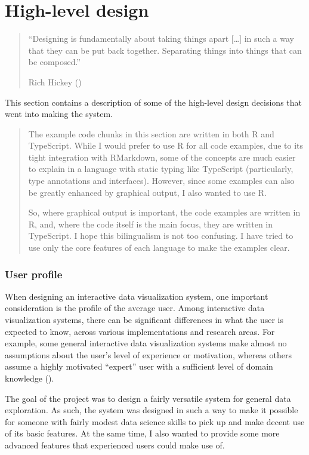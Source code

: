 \documentclass[
]{book}
\theoremstyle{definition}
\theoremstyle{definition}
\theoremstyle{definition}
\theoremstyle{definition}
\theoremstyle{remark}
\begin{document}
\chapter{High-level design}\label{high-level-design}

\begin{quote}
``Designing is fundamentally about taking things apart {[}\ldots{]} in such a way that they can be put back together. Separating things into things that can be composed.''

Rich Hickey ()
\end{quote}

This section contains a description of some of the high-level design decisions that went into making the system.

\begin{quote}
The example code chunks in this section are written in both R and TypeScript. While I would prefer to use R for all code examples, due to its tight integration with RMarkdown, some of the concepts are much easier to explain in a language with static typing like TypeScript (particularly, type annotations and interfaces). However, since some examples can also be greatly enhanced by graphical output, I also wanted to use R.

So, where graphical output is important, the code examples are written in R, and, where the code itself is the main focus, they are written in TypeScript. I hope this bilingualism is not too confusing. I have tried to use only the core features of each language to make the examples clear.
\end{quote}

\subsection{User profile}\label{user-profile-1}

When designing an interactive data visualization system, one important consideration is the profile of the average user. Among interactive data visualization systems, there can be significant differences in what the user is expected to know, across various implementations and research areas. For example, some general interactive data visualization systems make almost no assumptions about the user's level of experience or motivation, whereas others assume a highly motivated ``expert'' user with a sufficient level of domain knowledge ().

The goal of the project was to design a fairly versatile system for general data exploration. As such, the system was designed in such a way to make it possible for someone with fairly modest data science skills to pick up and make decent use of its basic features. At the same time, I also wanted to provide some more advanced features that experienced users could make use of.
\end{document}
